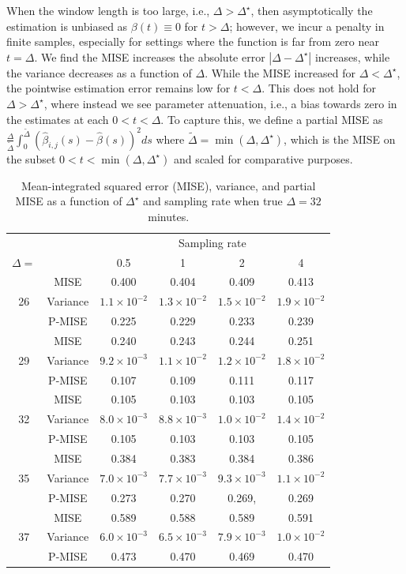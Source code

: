 \documentclass[12pt]{amsart}
\begin{document}
When the window length is too large, i.e., $\Delta > \Delta^\star$, then asymptotically the estimation is unbiased as $\beta(t) \equiv 0$ for $t > \Delta$; however, we incur a penalty in finite samples, especially for settings where the function is far from zero near $t = \Delta$.  We find the MISE increases the absolute error $|\Delta - \Delta^\star|$ increases, while the variance decreases as a function of $\Delta$.  While the MISE increased for $\Delta < \Delta^\star$, the pointwise estimation error remains low for $t < \Delta$.  This does not hold for $\Delta > \Delta^\star$, where instead we see parameter attenuation, i.e., a bias towards zero in the estimates at each $0 < t< \Delta$.  To capture this, we define a partial MISE as $\frac{\Delta}{\tilde \Delta} \int_0^{\tilde \Delta} ( \hat \beta_{i,j} (s) - \hat \beta (s) )^2 ds$ where $\tilde \Delta = \min(\Delta, \Delta^\star)$, which is the MISE on the subset $0<t< \min (\Delta, \Delta^\star)$ and scaled for comparative purposes.

\begin{table}[!th]
\begin{tabular}{c | c c c c c}
& & \multicolumn{4}{c}{Sampling rate} \\ \cline{3-6}
$\Delta=$ & & 0.5 & 1 & 2 & 4 \\ \hline
\multirow{3}{*}{26} & MISE & 0.400 & 0.404 & 0.409 & 0.413 \\
 & Variance & $1.1 \times 10^{-2}$ & $1.3 \times 10^{-2}$ & $1.5 \times 10^{-2}$ & $1.9 \times 10^{-2}$ \\
  & P-MISE & 0.225 & 0.229 & 0.233 & 0.239 \\ \hline
\multirow{3}{*}{29} & MISE & 0.240 & 0.243 & 0.244 & 0.251 \\
 & Variance & $9.2 \times 10^{-3}$ & $1.1 \times 10^{-2}$ & $1.2 \times 10^{-2}$ & $1.8 \times 10^{-2}$ \\
  & P-MISE & 0.107 & 0.109 & 0.111 & 0.117 \\ \hline
\multirow{3}{*}{32} & MISE & 0.105 & 0.103 & 0.103 & 0.105 \\
 & Variance & $8.0 \times 10^{-3}$ & $8.8 \times 10^{-3}$ & $1.0 \times 10^{-2}$ & $1.4 \times 10^{-2}$ \\
  & P-MISE & 0.105 & 0.103 & 0.103 & 0.105 \\\hline
\multirow{3}{*}{35} & MISE & 0.384 & 0.383 & 0.384 & 0.386 \\
 & Variance & $7.0 \times 10^{-3}$ & $7.7 \times 10^{-3}$ & $9.3 \times 10^{-3}$ & $1.1 \times 10^{-2}$ \\
  & P-MISE & 0.273 & 0.270 & 0.269, & 0.269 \\\hline
\multirow{3}{*}{37} & MISE & 0.589 & 0.588 & 0.589 & 0.591 \\
 & Variance & $6.0 \times 10^{-3}$ & $6.5 \times 10^{-3}$ & $7.9 \times 10^{-3}$ & $1.0 \times 10^{-2}$ \\
  & P-MISE & 0.473 & 0.470 & 0.469 & 0.470 \\\hline
\end{tabular}
\caption{Mean-integrated squared error (MISE), variance, and partial MISE as a function of $\Delta^\star$ and sampling rate when true $\Delta = 32$ minutes.}
\label{tab:mise_delta}
\end{table}
\end{document}
